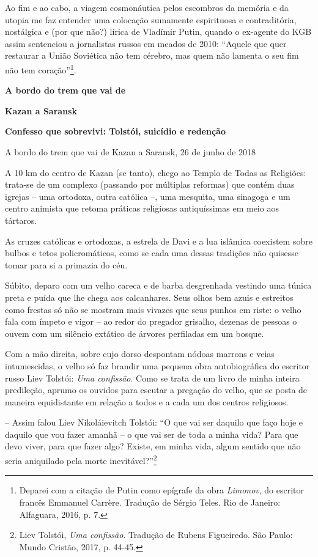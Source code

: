 Ao fim e ao cabo, a viagem cosmonáutica pelos escombros da memória e da
utopia me faz entender uma colocação sumamente espirituosa e
contraditória, nostálgica e (por que não?) lírica de Vladímir Putin,
quando o ex-agente do KGB assim sentenciou a jornalistas russos em
meados de 2010: ``Aquele que quer restaurar a União Soviética não tem
cérebro, mas quem não lamenta o seu fim não tem coração''\footnote{Deparei
  com a citação de Putin como epígrafe da obra \emph{Limonov}, do
  escritor francês Emmanuel Carrère. Tradução de Sérgio Teles. Rio de
  Janeiro: Alfaguara, 2016, p. 7.}.

\textbf{A bordo do trem que vai de }

\textbf{Kazan a Saransk}

\textbf{Confesso que sobrevivi: Tolstói, suicídio e redenção}

A bordo do trem que vai de Kazan a Saransk, 26 de junho de 2018

A 10 km do centro de Kazan (se tanto), chego ao Templo de Todas as
Religiões: trata-se de um complexo (passando por múltiplas reformas) que
contém duas igrejas -- uma ortodoxa, outra católica --, uma mesquita,
uma sinagoga e um centro animista que retoma práticas religiosas
antiquíssimas em meio aos tártaros.

As cruzes católicas e ortodoxas, a estrela de Davi e a lua islâmica
coexistem sobre bulbos e tetos policromáticos, como se cada uma dessas
tradições não quisesse tomar para si a primazia do céu.

Súbito, deparo com um velho careca e de barba desgrenhada vestindo uma
túnica preta e puída que lhe chega aos calcanhares. Seus olhos bem azuis
e estreitos como frestas só não se mostram mais vivazes que seus punhos
em riste: o velho fala com ímpeto e vigor -- ao redor do pregador
grisalho, dezenas de pessoas o ouvem com um silêncio extático de árvores
perfiladas em um bosque.

Com a mão direita, sobre cujo dorso despontam nódoas marrons e veias
intumescidas, o velho só faz brandir uma pequena obra autobiográfica do
escritor russo Liev Tolstói: \emph{Uma confissão}. Como se trata de um
livro de minha inteira predileção, aprumo os ouvidos para escutar a
pregação do velho, que se posta de maneira equidistante em relação a
todos e a cada um dos centros religiosos.

-- Assim falou Liev Nikoláievitch Tolstói: ``O que vai ser daquilo que
faço hoje e daquilo que vou fazer amanhã -- o que vai ser de toda a
minha vida? Para que devo viver, para que fazer algo? Existe, em minha
vida, algum sentido que não seria aniquilado pela morte
inevitável?''\footnote{Liev Tolstói, \emph{Uma confissão}. Tradução de
  Rubens Figueiredo. São Paulo: Mundo Cristão, 2017, p. 44-45.}

